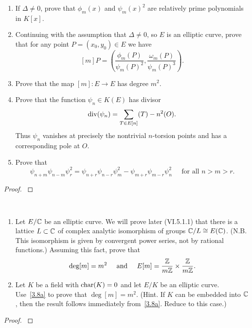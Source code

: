 \documentclass[12pt,reqno]{amsart}
\begin{document}
\begin{exe}
\begin{enumerate}
\item\label{3.7c}
If $\Delta \neq 0$, prove that $\phi_m(x)$ and $\psi_m(x)^2$ are relatively prime polynomials in $K[x]$.

\item\label{3.7d}
Continuing with the assumption that $\Delta \neq 0$, so $E$ is an elliptic curve, prove that for any point $P=(x_0, y_0)\in E$ we have
\[
[m]P=\left(\frac{\phi_m(P)}{\psi_m(P)^2}, \frac{\omega_m(P)}{\psi_m(P)^3}\right).
\]

\item\label{3.7e}
Prove that the map $[m]: E \to E$ has degree $m^2$.

\item\label{3.7f}
Prove that the function $\psi_n \in K(E)$ has divisor
\[
{\operatorname{div}}(\psi_n)=\sum_{T\in E[n]}(T)-n^2(O).
\]
Thus $\psi_n$ vanishes at precisely the nontrivial $n$-torsion points and has a corresponding pole at $O$.

\item\label{3.7g}
Prove that
\[
\psi_{n+m}\psi_{n-m}\psi_r^2=\psi_{n+r}\psi_{n-r}\psi_m^2-\psi_{m+r}\psi_{m-r}\psi_n^2\;\;\;\;\;\mbox{for all }n>m>r.
\]

\end{enumerate}
\begin{proof}\label{s3.7}

\end{proof} 
\end{exe} 

\begin{exe}\label{3.8}
{\ }
\begin{enumerate}
\item\label{3.8a}
Let $E/{\mathbb C}$ be an elliptic curve.  We will prove later (VI.5.1.1) that there is a lattice $L\subset {\mathbb C}$ of complex analytic isomorphism of groups ${\mathbb C}/L\cong E({\mathbb C})$.  (N.B. This isomorphism is given by convergent power series, not by rational functions.)  Assuming this fact, prove that
\[
\deg[m]=m^2 \;\;\;\;\;\mbox{and}\;\;\;\;\;E[m]=\frac{{\mathbb Z}}{m{\mathbb Z}}\times \frac{{\mathbb Z}}{m{\mathbb Z}}.
\]
\item\label{3.8b}
Let $K$ be a field with ${\operatorname{char}}(K)=0$ and let $E/K$ be an elliptic curve.  Use~\ref{3.8a} to prove that $\deg[m]=m^2$.  (Hint.  If $K$ can be embedded into ${\mathbb C}$, then the result follows immediately from~\ref{3.8a}.  Reduce to this case.)
\end{enumerate}
\begin{proof}\label{s3.8}

\end{proof} 
\end{exe} 
\end{document}
